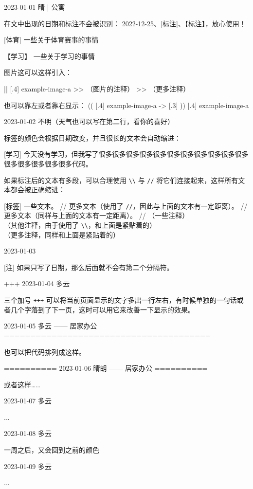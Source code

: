 \documentclass[11pt, paperstyle=light yellow, color entry]{jwjournal}
\begin{document}
2023-01-01 晴 | 公寓

  在文中出现的日期和标注不会被识别： 2022-12-25、[标注]、【标注】，放心使用！

  [体育] 一些关于体育赛事的事情

  【学习】 %
  一些关于学习的事情

  图片这可以这样引入：

  || [.4] {example-image-a}
  >> （图片的注释）
  >> （更多注释）

  也可以靠左或者靠右显示：
  (( [.4] {example-image-a}
  -> [.3] %
  )) [.4] {example-image-a}



2023-01-02
不明（天气也可以写在第二行，看你的喜好）

  标签的颜色会根据日期改变，并且很长的文本会自动缩进：

  [学习] 今天没有学习，但我写了很多很多很多很多很多很多很多很多很多很多很多很多很多很多很多很多代码。

  如果标注后的文本有多段，可以合理使用 \texttt{\textbackslash\textbackslash} 与 \texttt{\slash\slash} 将它们连接起来，这样所有文本都会被正确缩进：

  [标签] 一些文本。
    //
    更多文本（使用了 \texttt{\slash\slash}，因此与上面的文本有一定距离）。
    //
    更多文本（同样与上面的文本有一定距离）。
    //
    （一些注释）
    \\
    （其他注释，由于使用了 \texttt{\textbackslash\textbackslash}，和上面是紧贴着的）
    \\
    （更多注释，同样和上面是紧贴着的）



2023-01-03

  [注] 如果只写了日期，那么后面就不会有第二个分隔符。


+++
2023-01-04  多云

  三个加号 \texttt{+++} 可以将当前页面显示的文字多出一行左右，有时候单独的一句话或者几个字落到了下一页，这时可以用它来改善一下显示的效果。



2023-01-05    多云        —— 居家办公
=======================================

也可以把代码排列成这样。


==========
2023-01-06    晴朗        —— 居家办公
==========

或者这样……



2023-01-07  多云

  ...



2023-01-08  多云

  一周之后，又会回到之前的颜色



2023-01-09  多云

  ...
\end{document}
